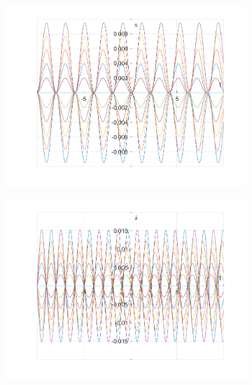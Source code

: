 \documentclass{article}
\begin{document}
	\begin{figure}[h!]
		\centering
		\begin{subfigure}[b]{0.48\linewidth}
			\includegraphics[width=\linewidth]{./SmallOscillations/S6/F3.png}
		\end{subfigure}
		\begin{subfigure}[b]{0.48\linewidth}
			\includegraphics[width=\linewidth]{./SmallOscillations/S6/F4.png}
		\end{subfigure}
	\end{figure}
	
\end{document}
